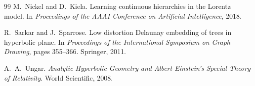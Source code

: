 \documentclass[12pt,a4paper]{article}
\begin{document}
\begin{thebibliography}{99}
M.~Nickel and D.~Kiela.
\newblock Learning continuous hierarchies in the {L}orentz model.
\newblock In \emph{Proceedings of the AAAI Conference on Artificial Intelligence}, 2018.

R.~Sarkar and J.~Sparrose.
\newblock Low distortion {D}elaunay embedding of trees in hyperbolic plane.
\newblock In \emph{Proceedings of the International Symposium on Graph Drawing}, pages 355--366. Springer, 2011.

A.~A.~Ungar.
\newblock \emph{Analytic Hyperbolic Geometry and Albert {E}instein's Special Theory of Relativity}.
\newblock World Scientific, 2008.

\end{thebibliography}
\end{document}
